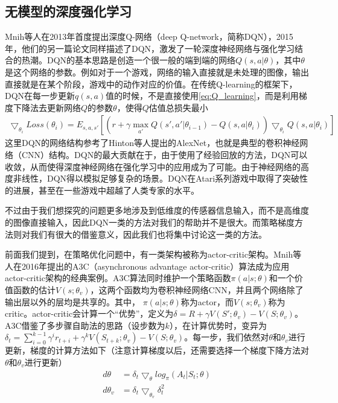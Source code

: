     \subsection{无模型的深度强化学习}
      Mnih等人在2013年首度提出深度Q-网络（deep Q-network，简称DQN）\cite{atari_2013}，2015年，他们的另一篇论文同样描述了DQN\cite{nature2015}，激发了一轮深度神经网络与强化学习结合的热潮\cite{deepRL_overview}。DQN的基本思路是创造一个很一般的端到端的网络$Q(s, a | \theta)$，其中$\theta$是这个网络的参数。例如对于一个游戏，网络的输入直接就是未处理的图像，输出直接就是在某个阶段，游戏中的动作对应的价值。在传统Q-learning的框架下，DQN在每一步更新$q(s, a)$值的时候，不是直接使用\eqref{eq:Q_learning}，而是利用梯度下降法去更新网络$Q$的参数$\theta$，使得$Q$估值总损失最小
      \begin{align*}
        \bigtriangledown_{\theta_i}Loss(\theta_i) = E_{s, a, s'}[(r+\gamma \max_{a'}Q(s', a'|\theta_{i-1}) - Q(s, a|\theta_i))\bigtriangledown_{\theta_i}Q(s, a|\theta_i)]
      \end{align*}
      这里DQN的网络结构参考了Hinton等人提出的AlexNet\cite{AlexNet}，也就是典型的卷积神经网络（CNN）结构。DQN的最大贡献在于，由于使用了经验回放的方法，DQN可以收敛，从而使得深度神经网络在强化学习中的应用成为了可能。由于神经网络的高度非线性，DQN得以模拟足够复杂的场景。DQN在Atari系列游戏中取得了突破性的进展，甚至在一些游戏中超越了人类专家的水平。\par
      不过由于我们想探究的问题更多地涉及到低维度的传感器信息输入，而不是高维度的图像直接输入，因此DQN一类的方法对我们的帮助并不是很大。而策略梯度方法则对我们有很大的借鉴意义，因此我们也将集中讨论这一类的方法。\par
      前面我们提到，在策略优化问题中，有一类架构被称为actor-critic架构。Mnih等人在2016年提出的A3C（asynchronous advantage actor-critic）算法\cite{A3C}成为应用actor-critic架构的经典案例。A3C算法同时维护一个策略函数$\pi(a|s; \theta)$和一个价值函数的估计$V(s; \theta_v )$，这两个函数均为卷积神经网络CNN，并且两个网络除了输出层以外的层均是共享的。其中， $\pi(a|s; \theta)$称为actor，而$V(s; \theta_v )$称为critic。actor-critic会计算一个``优势''，定义为$\delta = R + \gamma V(S'; \theta_v) - V(S; \theta_v)$\cite{Sutton_book}。A3C借鉴了多步骤自助法的思路（设步数为$k$），在计算优势时，变异为$\delta_t = \sum_{i = 0}^{k - 1}\gamma^i r_{t+i} + \gamma^k V(S_{t+k}; \theta_v) - V(S; \theta_v)$。每一步，我们依然对$\theta$和$\theta_v$进行更新，梯度的计算方法如下（注意计算梯度以后，还需要选择一个梯度下降方法对$\theta$和$\theta_v$进行更新）
      \begin{align}
      \label{eq:A3C_gradient1}
          d\theta &= \delta_t \bigtriangledown_{\theta} log_\pi(A_t|S_t; \theta)\\
      \label{eq:A3C_gradient2}
          d\theta_v &= \delta_t \bigtriangledown_{\theta_v} \delta_t^2
      \end{align}
